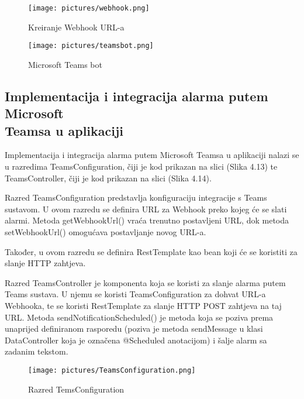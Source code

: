 \documentclass[times, utf8, zavrsni]{fer}
\begin{document}
\begin{figure}[h!]
			\texttt{[image: pictures/webhook.png]} %
		\centering
			\caption{Kreiranje Webhook URL-a}
			\label{fig:promjene}
\end{figure}

\begin{figure}[h!]
			\texttt{[image: pictures/teamsbot.png]} %
		\centering
			\caption{Microsoft Teams bot}
			\label{fig:promjene}
\end{figure}

\newpage
\subsection{Implementacija i integracija alarma putem Microsoft \\ Teamsa u aplikaciji}
Implementacija i integracija alarma putem Microsoft Teamsa u aplikaciji nalazi se u razredima {\selectfont TeamsConfiguration}, čiji je kod prikazan na slici (Slika 4.13) te {\selectfont TeamsController}, čiji je kod prikazan na slici (Slika 4.14).

Razred {\selectfont TeamsConfiguration} predstavlja konfiguraciju integracije s Teams sustavom. U ovom razredu se definira URL za Webhook preko kojeg će se slati alarmi. Metoda {\selectfont getWebhookUrl()} vraća trenutno postavljeni URL, dok metoda {\selectfont setWebhookUrl()} omogućava postavljanje novog URL-a.

Također, u ovom razredu se definira {\selectfont RestTemplate} kao bean koji će se koristiti za slanje HTTP zahtjeva.

Razred {\selectfont TeamsController} je komponenta koja se koristi za slanje alarma putem Teams sustava. U njemu se koristi {\selectfont TeamsConfiguration} za dohvat URL-a Webhooka, te se koristi {\selectfont RestTemplate} za slanje HTTP POST zahtjeva na taj URL. Metoda {\selectfont sendNotificationScheduled()} je metoda koja se poziva prema unaprijed definiranom rasporedu (poziva je metoda {\selectfont sendMessage} u klasi {\selectfont DataController} koja je označena @Scheduled anotacijom) i šalje alarm sa zadanim tekstom.


       \begin{figure}[h!]
			\texttt{[image: pictures/TeamsConfiguration.png]} %
		\centering
			\caption{Razred TemsConfiguration}
			\label{fig:promjene}
     \end{figure}
     
\end{document}
